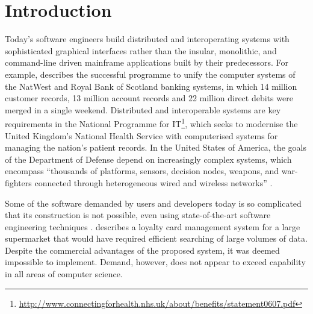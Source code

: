 


\chapter{Introduction}
\label{Introduction}
Today's software engineers build distributed and interoperating systems with sophisticated graphical interfaces rather than the insular, monolithic, and command-line driven mainframe applications built by their predecessors. For example, \cite[pg26]{rae04challenges} describes the successful programme to unify the computer systems of the NatWest and Royal Bank of Scotland banking systems, in which 14 million customer records, 13 million account records and 22 million direct debits were merged in a single weekend. Distributed and interoperable systems are key requirements in the National Programme for IT\footnote{\url{http://www.connectingforhealth.nhs.uk/about/benefits/statement0607.pdf}}, which seeks to modernise the United Kingdom's National Health Service with computerised systems for managing the nation's patient records. In the United States of America, the goals of the Department of Defense depend on increasingly complex systems, which encompass ``thousands of platforms, sensors, decision nodes, weapons, and war-fighters connected through heterogeneous wired and wireless networks'' \cite{northrop06ulss}.

Some of the software demanded by users and developers today is so complicated that its construction is not possible, even using state-of-the-art software engineering techniques \cite{selic03pragmatics}. \cite[pg15]{rae04challenges} describes a loyalty card management system for a large supermarket that would have required efficient searching of large volumes of data. Despite the commercial advantages of the proposed system, it was deemed impossible to implement. Demand, however, does not appear to exceed capability in all areas of computer science.


